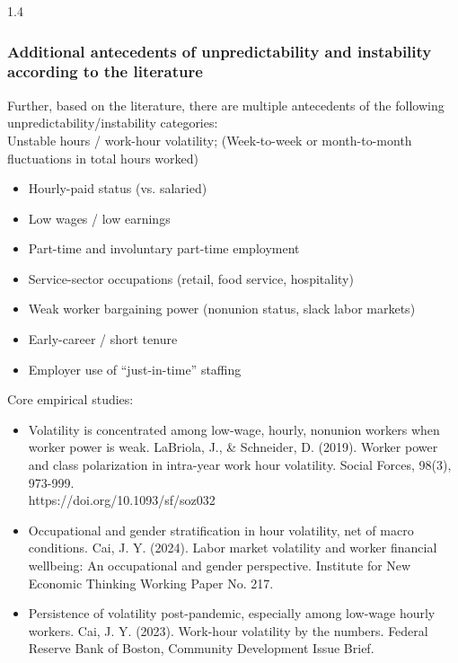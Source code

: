\documentclass[10pt, letterpaper]{article}
\begin{document}
\begin{spacing}{1.4}
\subsubsection{Additional antecedents of unpredictability and instability according to the literature}

Further, based on the literature, there are multiple antecedents of the following unpredictability/instability categories:\\

Unstable hours / work-hour volatility; (Week-to-week or month-to-month fluctuations in total hours worked)%
\begin{itemize}
\item Hourly-paid status (vs. salaried)
\item Low wages / low earnings                                           
\item Part-time and involuntary part-time employment                     
\item Service-sector occupations (retail, food service, hospitality)     
\item Weak worker bargaining power (nonunion status, slack labor markets)
\item Early-career / short tenure                                        
\item Employer use of ``just-in-time'' staffing                          
\end{itemize}

Core empirical studies:
\begin{itemize}
\item Volatility is concentrated among low-wage, hourly, nonunion workers  when worker power is weak. LaBriola, J., \& Schneider, D. (2019). Worker power and class polarization in intra-year work hour volatility. Social Forces, 98(3), 973-999.\\ https://doi.org/10.1093/sf/soz032
\item Occupational and gender stratification in hour volatility, net of macro
  conditions. Cai, J. Y. (2024). Labor market volatility and worker financial wellbeing: An occupational and gender perspective. Institute for New Economic Thinking Working Paper No. 217. 
\item Persistence of volatility post-pandemic, especially among low-wage hourly workers. Cai, J. Y. (2023). Work-hour volatility by the numbers. Federal Reserve Bank of Boston, Community Development Issue Brief.
\end{itemize}



\end{spacing}
\end{document}
